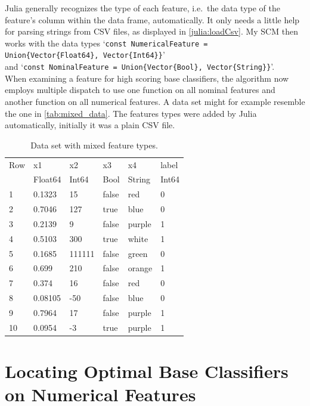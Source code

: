 Julia generally recognizes the type of each feature, i.e.\ the data type of the feature's column within the data frame, automatically.
It only needs a little help for parsing strings from CSV files, as displayed in \autoref{julia:loadCsv}.
My SCM then works with the data types `\verb|const NumericalFeature = Union{Vector{Float64}, Vector{Int64}}|'\\
and `\texttt{const NominalFeature = Union\{Vector\{Bool\}, Vector\{String\}\}}'.\\
When examining a feature for high scoring base classifiers, the algorithm now employs multiple dispatch to use one function
on all nominal features and another function on all numerical features.
A data set might for example resemble the one in \autoref{tab:mixed_data}.
The features types were added by Julia automatically, initially it was a plain CSV file.

\begin{table}[ht]
    \centering
    \caption{Data set with mixed feature types.}\label{tab:mixed_data}
    \begin{tabular}{l|lllll}
        Row & x1 & x2 & x3 & x4 & label \\
         & Float64 & Int64 & Bool & String & Int64 \\
        \midrule
        1 & 0.1323 & 15 & false & red & 0 \\
        2 & 0.7046 & 127 & true & blue & 0 \\
        3 & 0.2139 & 9 & false & purple & 1 \\
        4 & 0.5103 & 300 & true & white & 1 \\
        5 & 0.1685 & 111111 & false & green & 0 \\
        6 & 0.699 & 210 & false & orange & 1 \\
        7 & 0.374 & 16 & false & red & 0 \\
        8 & 0.08105 & -50 & false & blue & 0 \\
        9 & 0.7964 & 17 & false & purple & 1 \\
        10 & 0.0954 & -3 & true & purple & 1
    \end{tabular}
\end{table}

\section{Locating Optimal Base Classifiers on Numerical Features}\label{sec:numerical}

